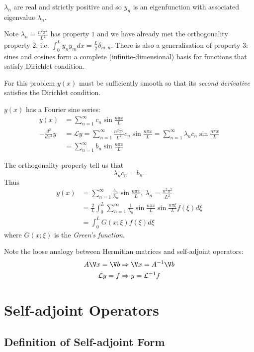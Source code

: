 \documentclass[a4paper]{article}
\renewcommand*\L{\mathcal{L}}
\begin{document}
\begin{note}
  \(\lambda_n\) are real and strictly positive and so \(y_n\) is an eigenfunction with associated eigenvalue \(\lambda_n\).
\end{note}

Note \(\lambda_n = \frac{n^2\pi^2}{L^2}\) has property \(1\) and we have already met the orthogonality property \(2\), i.e. \(\int_{0}^{L} y_ny_m dx=\frac{L}{2}\delta_{m,n} \). There is also a generalisation of property \(3\): sines and cosines form a complete (infinite-dimensional) basis for functions that satisfy Dirichlet condition.

For this problem \(y(x)\) must be sufficiently smooth so that its \emph{second derivative} satisfies the Dirichlet condition.

\(y(x)\) has a Fourier sine series:
\begin{align*}
  y(x) &= \sum_{n=1}^{\infty}c_n \sin \frac{n\pi x}{L} \\
  -\frac{d^2}{dx^2} y &= \L y = \sum_{n=1}^{\infty} \frac{n^2\pi^2}{L^2}c_n \sin \frac{n\pi x}{L} = \sum_{n=1}^{\infty} \lambda_n c_n \sin \frac{n\pi x}{L} \\
       &= \sum_{n=1}^{\infty}b_n \sin \frac{n\pi x}{L}
\end{align*}

The orthogonality property tell us that
\[
\lambda_n c_n = b_n.
\]
Thus
\begin{align*}
  y(x) &= \sum_{n=1}^{\infty} \frac{b_n}{\lambda_n} \sin \frac{n\pi x}{L}, \: \lambda_n = \frac{n^2\pi^2}{L^2} \\
       &= \frac{2}{L} \int_{0}^{L} \sum_{n=1}^{\infty} \frac{1}{\lambda_n} \sin \frac{n\pi x}{L}\sin\frac{n\pi\xi}{L} f(\xi) d\xi \\
        &= \int_{0}^{L} G(x; \xi) f(\xi) d\xi\end{align*}
where \(G(x;\xi)\) is the \emph{Green's function}.

Note the loose analogy between Hermitian matrices and self-adjoint operators:
\begin{align*}
  A\V x = \V b &\Rightarrow \V x = A^{-1}\V b \\
  \L y = f &\Rightarrow y = \L^{-1} f
\end{align*}

\section{Self-adjoint Operators}

\subsection{Definition of Self-adjoint Form}
\end{document}

